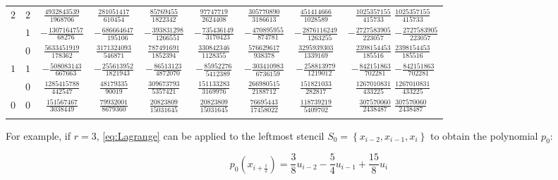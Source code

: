 \begin{table}
\begin{center}
\begin{tabular}{ccccccccc}
      $2$  &  $2$  &  $ \frac{ 4932843539}{1968706} $  &  $ \frac{  281051417}{  610454}$  &  $ \frac{   85769455}{ 1822342}$  &  $ \frac{  97747719}{ 2624408}$  &  $ \frac{  305770890}{ 3186613}$  &  $ \frac{ 451414666}{ 1028589} $  &  $ \frac{1025357155}{ 415733}$  $ \frac{1025357155}{ 415733}$  \\ \addlinespace
           &  $1$  &  $-\frac{ 1307164757}{  68276} $  &  $-\frac{  686664647}{  195106}$  &  $-\frac{  393831298}{ 1266551}$  &  $-\frac{ 735436149}{ 3170423}$  &  $-\frac{  470895955}{  874781}$  &  $-\frac{2876116249}{ 1263255} $  &  $-\frac{2727583905}{ 223057}$  $-\frac{2727583905}{ 223057}$  \\ \addlinespace
           &  $0$  &  $ \frac{ 5633451919}{ 178362} $  &  $ \frac{ 3171324093}{  546871}$  &  $ \frac{  787491691}{ 1852394}$  &  $ \frac{ 330842346}{ 1128355}$  &  $ \frac{  576629617}{  938378}$  &  $ \frac{3295939303}{ 1339169} $  &  $ \frac{2398154453}{ 185516}$  $ \frac{2398154453}{ 185516}$  \\ \addlinespace
      $1$  &  $1$  &  $-\frac{  508083143}{ 667663} $  &  $-\frac{  255613952}{ 1821943}$  &  $-\frac{   86513123}{ 4872070}$  &  $-\frac{  85952276}{ 5412389}$  &  $-\frac{  303410983}{ 6736159}$  &  $-\frac{ 258813979}{ 1219012} $  &  $-\frac{ 842151863}{ 702281}$  $-\frac{ 842151863}{ 702281}$  \\ \addlinespace
           &  $0$  &  $ \frac{ 1285415788}{ 442547} $  &  $ \frac{   48179335}{   90019}$  &  $ \frac{  309673793}{ 5357421}$  &  $ \frac{ 151133283}{ 3169976}$  &  $ \frac{  266980515}{ 2188712}$  &  $ \frac{ 151821033}{  282817} $  &  $ \frac{1267010831}{ 433225}$  $ \frac{1267010831}{ 433225}$  \\ \addlinespace
      $0$  &  $0$  &  $ \frac{  151567467}{3038449} $  &  $ \frac{   79932001}{ 8679360}$  &  $ \frac{   20823809}{15031645}$  &  $ \frac{  20823809}{15031645}$  &  $ \frac{   76695443}{17458022}$  &  $ \frac{ 118739219}{ 5409702} $  &  $ \frac{ 307570060}{2438487}$  $ \frac{ 307570060}{2438487}$  \\ \addlinespace
      \bottomrule
    \end{tabular}
  \end{center}
\end{table}

For example, if $r=3$, \eqref{eq:Lagrange} can be applied to the leftmost stencil $S_0=\left\{ x_{i-2}, x_{i-1}, x_i \right\}$ to obtain the polynomial $p_0$:

\begin{equation}
  \label{eq:pol_0}
  p_0(x_{i+\frac{1}{2}}) = \frac{3}{8} u_{i-2} - \frac{5}{4} u_{i-1} + \frac{15}{8} u_i
\end{equation}

